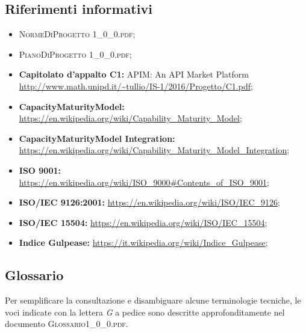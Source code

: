 \subsection{Riferimenti informativi}
\begin{itemize}
	\item \textsc{NormeDiProgetto 1\_0\_0.pdf};
	\item \textsc{PianoDiProgetto 1\_0\_0.pdf};
	\item \textbf{Capitolato d’appalto C1:} APIM: An API Market Platform\\ \url{http://www.math.unipd.it/~tullio/IS-1/2016/Progetto/C1.pdf};
	\item \textbf{CapacityMaturityModel:} \url{https://en.wikipedia.org/wiki/Capability_Maturity_Model};
	\item \textbf{CapacityMaturityModel Integration:} \url{https://en.wikipedia.org/wiki/Capability_Maturity_Model_Integration};
	\item \textbf{ISO 9001:} \url{https://en.wikipedia.org/wiki/ISO_9000#Contents_of_ISO_9001};
	\item \textbf{ISO/IEC 9126:2001:} \url{https://en.wikipedia.org/wiki/ISO/IEC_9126};
	\item \textbf{ISO/IEC 15504:} \url{https://en.wikipedia.org/wiki/ISO/IEC_15504};
	\item \textbf{Indice Gulpease:} \url{https://it.wikipedia.org/wiki/Indice_Gulpease};
	
\end{itemize}


\subsection{Glossario}
Per semplificare la consultazione e disambiguare alcune terminologie tecniche, le voci indicate con la lettera \textit{G} a pedice sono descritte approfonditamente nel documento \textsc{Glossario1\_0\_0.pdf}.